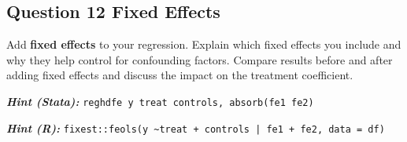 \documentclass[paper=a4, fontsize=11pt]{scrartcl}
\begin{document}
\subsection*{Question 12 \quad Fixed Effects}

Add \textbf{fixed effects} to your regression. Explain which fixed effects you include and why they help control for confounding factors. Compare results before and after adding fixed effects and discuss the impact on the treatment coefficient.

\medskip
\textit{\textbf{Hint (Stata):}} \texttt{reghdfe y treat controls, absorb(fe1 fe2)}

\textit{\textbf{Hint (R):}} \texttt{fixest::feols(y \textasciitilde treat + controls | fe1 + fe2, data = df)}
\end{document}

